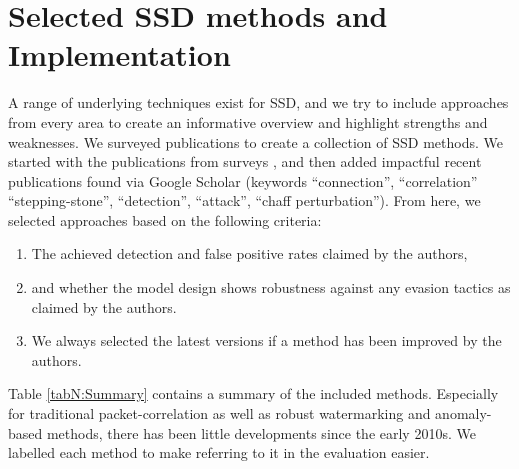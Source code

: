 \section{Selected SSD methods and Implementation}\label{SecN:Selection}

A range of underlying techniques exist for SSD, and we try to include approaches from every area to create an informative overview and highlight strengths and weaknesses. 
We surveyed publications to create a collection of SSD methods. We started with the publications from surveys \cite{shullich2011survey,wang2018research}, and then added impactful recent publications found via Google Scholar (keywords ``connection'', ``correlation'' ``stepping-stone'', ``detection'', ``attack'', ``chaff perturbation'').
From here, we selected approaches based on the following criteria:


\begin{enumerate}
\item The achieved detection and false positive rates claimed by the authors,
\item and whether the model design shows robustness against any evasion tactics as claimed by the authors.
\item We always selected the latest versions if a method has been improved by the authors.
\end{enumerate}


Table \ref{tabN:Summary} contains a summary of the included methods. Especially for traditional packet-correlation as well as robust watermarking and anomaly-based methods, there has been little developments since the early 2010s.
We labelled each method to make referring to it in the evaluation easier.

